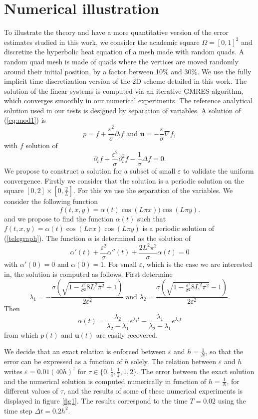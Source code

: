 \documentclass[a4paper,french,english,10pt]{article}
\newcommand\eps{\varepsilon}
\begin{document}
\section{Numerical illustration}\label{sec::num}

To illustrate the theory and have a more quantitative version of the error estimates
studied in this work, we consider the academic square $\Omega=[0,1]^2$ and discretize the hyperbolic heat equation
of a mesh made with random quads. 
A random quad mesh is made of quads where the vertices are moved
randomly around their initial position, by a factor between 10\% and 30\%.
We use the fully implicit time discretization version of the 2D scheme
detailed in this work. The solution of the linear systems is computed via
an iterative GMRES algorithm, which converges smoothly in our numerical experiments.
The reference analytical solution used in our tests is designed by separation of variables.
A solution of (\ref{eq:mod1}) is
$$
p= f+\frac{\eps^2}\sigma \partial_t f
\mbox{ and }
\mathbf u= -\frac\eps \sigma \nabla f,
$$
with $f$ solution of 
\begin{equation}\label{telegraph}
\partial_t f +\frac{\eps^2}\sigma \partial_t^2 f -\frac1\sigma \Delta f=0.
\end{equation}
 We propose to construct a solution for a subset of small $\eps$ to validate the uniform convergence. Firstly we consider that the solution is a periodic solution on the square $\left[0,2\right]\times\left[0,\frac{2}{L}\right]$. For this we use the separation of the variables. We consider the following function
$$
f(t,x,y)=\alpha(t)\cos (L \pi x ))\cos( L\pi y ).
$$
and we propose to find the function $\alpha(t)$ such that $f(t,x,y)=\alpha(t)\cos (L\pi x )\cos( L\pi y )$ is a periodic solution of (\ref{telegraph}).
The function $\alpha$ is determined as the solution of
$$
\alpha'(t)+ \frac{\eps^2}\sigma\alpha''(t)+\frac{2L^2\pi^2}\sigma \alpha(t)=0
$$
with $\alpha'(0)=0$ and $\alpha(0)=1$.
For small $\eps$, which is the case we are interested in, the solution is computed as follows.
First determine 
$$
\lambda_1=-
\frac{
\sigma \left( \sqrt{1-\frac{\eps^2}{\sigma^2}  8L^2 \pi^2  } +1\right)
}{2 \eps^2  }
\mbox{ and }
\lambda_2=
\frac{
\sigma \left( \sqrt{1-\frac{\eps^2}{\sigma^2}  8L^2 \pi^2  } -1\right)
}{2 \eps^2  }.
$$
Then 
$$
\alpha(t)=\frac{\lambda_2}{\lambda_2-\lambda_1}e^{\lambda_1 t  }
-
\frac{\lambda_1}{\lambda_2-\lambda_1}e^{\lambda_2 t  }
$$
from which $p(t)$ and $\mathbf u(t)$ are easily recovered.

We decide that an exact relation is enforced between
$\eps$ and $h=\frac1N$, so that the error can be expressed as a function of $h$ solely.
The relation between $\eps$ and $h$ writes
$\eps=0.01 (40h)^\tau$ for $\tau \in\{0,\frac14, \frac12, 1, 2  \}$.
The error between the exact solution and the numerical solution is computed numerically
in function of $h=\frac1N$, for different values of $\tau$, and the results of some of these numerical experiments is
displayed in figure \ref{fig1}. The results correspond  to the  time $T = 0.02$ using the time step 
$\Delta t = 0.2 h^2$.
\end{document}
